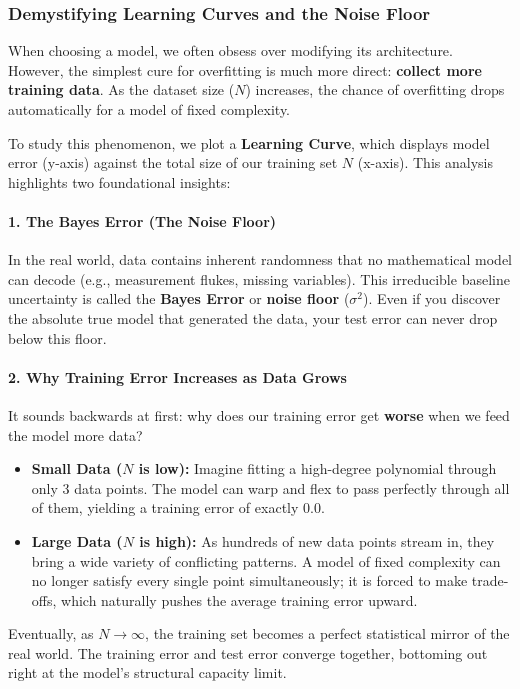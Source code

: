 \documentclass{article}
\begin{document}
\subsubsection{Demystifying Learning Curves and the Noise Floor}
When choosing a model, we often obsess over modifying its architecture. However, the simplest cure for overfitting is much more direct: \textbf{collect more training data}. As the dataset size ($N$) increases, the chance of overfitting drops automatically for a model of fixed complexity.

To study this phenomenon, we plot a \textbf{Learning Curve}, which displays model error (y-axis) against the total size of our training set $N$ (x-axis). This analysis highlights two foundational insights:

\paragraph{1. The Bayes Error (The Noise Floor)}
In the real world, data contains inherent randomness that no mathematical model can decode (e.g., measurement flukes, missing variables). This irreducible baseline uncertainty is called the \textbf{Bayes Error} or \textbf{noise floor} ($\sigma^2$). Even if you discover the absolute true model that generated the data, your test error can never drop below this floor.

\paragraph{2. Why Training Error Increases as Data Grows}
It sounds backwards at first: why does our training error get \textbf{worse} when we feed the model more data? 
\begin{itemize}
    \item \textbf{Small Data ($N$ is low):} Imagine fitting a high-degree polynomial through only $3$ data points. The model can warp and flex to pass perfectly through all of them, yielding a training error of exactly $0.0$.
    \item \textbf{Large Data ($N$ is high):} As hundreds of new data points stream in, they bring a wide variety of conflicting patterns. A model of fixed complexity can no longer satisfy every single point simultaneously; it is forced to make trade-offs, which naturally pushes the average training error upward.
\end{itemize}

Eventually, as $N \to \infty$, the training set becomes a perfect statistical mirror of the real world. The training error and test error converge together, bottoming out right at the model's structural capacity limit.
\end{document}

